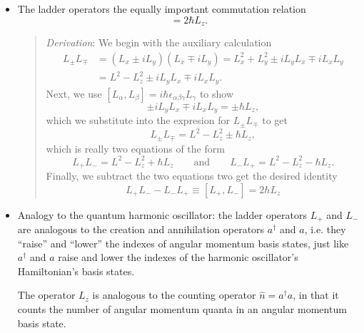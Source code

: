\documentclass[11pt, a4paper]{article}
\begin{document}
\begin{itemize}
	\item The ladder operators the equally important commutation relation
    \begin{equation*}
        [L_{+}, L_{-}] = 2 \hbar L_{z}.
    \end{equation*}
    \begin{quote}
        \textit{Derivation}: We begin with the auxiliary calculation
        \begin{align*}
            L_{\pm}L_{\mp} &= (L_{x} \pm i L_{y})(L_{x} \mp i L_{y}) = L_{x}^{2} + L_{y}^{2} \pm i L_{y}L_{x} \mp i L_{x}L_{y} \\
            & = L^{2} - L_{z}^{2} \pm i L_{y}L_{x} \mp i L_{x}L_{y}.
        \end{align*}
        Next, we use $ [L_{\alpha}, L_{\beta}] = i \hbar \epsilon_{\alpha \beta \gamma} L_{\gamma}  $ to show 
        \begin{equation*}
            \pm i L_{y}L_{x} \mp i L_{x}L_{y} = \pm \hbar L_{z},
        \end{equation*}
        which we substitute into the expresion for $ L_{\pm}L_{\mp} $ to get
        \begin{equation*}
            L_{\pm}L_{\mp} = L^{2} - L_{z}^{2} \pm \hbar L_{z},
        \end{equation*}
        which is really two equations of the form
        \begin{equation*}
            L_{+} L_{-} = L^{2} - L_{z}^{2} + \hbar L_{z} \qquad \text{and} \qquad L_{-} L_{+} = L^{2} - L_{z}^{2} - \hbar L_{z}.
        \end{equation*}
        Finally, we subtract the two equations two get the desired identity
        \begin{equation*}
            L_{+}L_{-} - L_{-}L_{+}  \equiv [L_{+}, L_{-}] = 2 \hbar L_{z}
        \end{equation*}
    \end{quote}
    

	
	\item Analogy to the quantum harmonic oscillator: the ladder operators $ L_{+} $ and $ L_{-} $ are analogous to the creation and annihilation operators $ a^{\dagger} $  and $ a $, i.e. they ``raise'' and ``lower'' the indexes of angular momentum basis states, just like $ a^{\dagger} $ and $ a $ raise and lower the indexes of the harmonic oscillator's Hamiltonian's basis states. 
	
	The operator $ L_{z} $ is analogous to the counting operator $ \hat{n} = a^{\dagger}a $, in that it counts the number of angular momentum quanta in an angular momentum basis state. 

\end{itemize}
\end{document}
